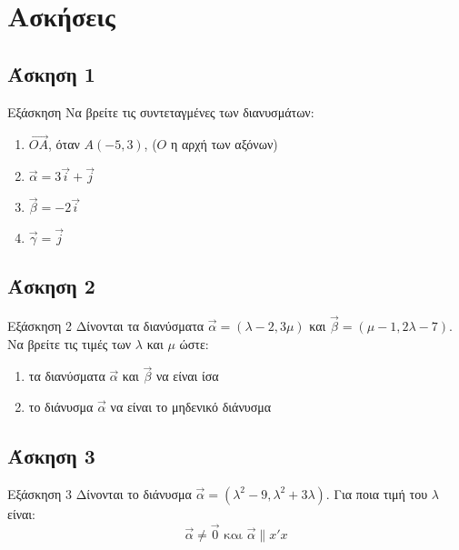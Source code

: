 \documentclass[greek]{beamer}
\begin{document}
\section{Ασκήσεις}

\subsection{Άσκηση 1}
\begin{frame}[label=Άσκηση1,t]{Εξάσκηση}
      Να βρείτε τις συντεταγμένες των διανυσμάτων:
      \begin{enumerate}
            \item<1-> $\overrightarrow{ΟΑ}$, όταν $Α(-5,3)$, ($Ο$ η αρχή των αξόνων)
            \item<2-> $\vec{α}=3\vec{i}+\vec{j}$
            \item<3-> $\vec{β}=-2\vec{i}$
            \item<4-> $\vec{γ}=\vec{j}$
      \end{enumerate}
\end{frame}

\subsection{Άσκηση 2}
\begin{frame}[label=Άσκηση2,t]{Εξάσκηση 2}
      Δίνονται τα διανύσματα $\vec{α}=(λ-2,3μ)$ και $\vec{β}=(μ-1,2λ-7)$. Να βρείτε τις τιμές των $λ$ και $μ$ ώστε:
      \begin{enumerate}
            \item<1-> τα διανύσματα $\vec{α}$ και $\vec{β}$ να είναι ίσα
            \item<2-> το διάνυσμα $\vec{α}$ να είναι το μηδενικό διάνυσμα
      \end{enumerate}
\end{frame}

\subsection{Άσκηση 3}
\begin{frame}[label=Άσκηση3,t]{Εξάσκηση 3}
      Δίνονται το διάνυσμα $\vec{α}=(λ^2-9,λ^2+3λ)$. Για ποια τιμή του $λ$ είναι:
      $$\vec{α}\ne \vec{0} \text{ και } \vec{α}\parallel x'x$$
\end{frame}
\end{document}
